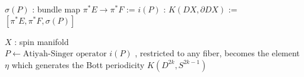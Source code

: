 \begin{Definition}
\itemdefi
  \Define \(\sigma(P)\) : bundle map \(\pi^* E \to \pi^* F\) := 
\itemdefi
  \Define \(i(P)\) : \(K(DX , \partial DX)\) := \([\pi^*E , \pi^*F , \sigma(P)]\)
\end{Definition}

\begin{Theorem}
\itemwhen
  \Let \(X\) : spin manifold \\
  \Let \(P \leftarrow \text{Atiyah-Singer operator}\)
\itemprop
  \Then \(i(P)\) , restricted to any fiber, becomes the element \(\eta\) which generates the Bott periodicity
  \(K(D^{2k} , S^{2k-1})\)
\end{Theorem}